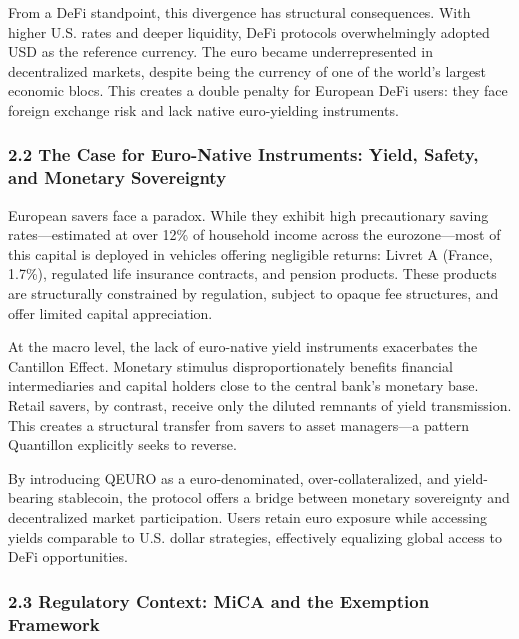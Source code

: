 From a DeFi standpoint, this divergence has structural consequences.
With higher U.S. rates and deeper liquidity, DeFi protocols
overwhelmingly adopted USD as the reference currency. The euro became
underrepresented in decentralized markets, despite being the currency of
one of the world's largest economic blocs. This creates a double penalty
for European DeFi users: they face foreign exchange risk and lack native
euro-yielding instruments.

\hypertarget{the-case-for-euro-native-instruments-yield-safety-and-monetary-sovereignty}{%
\subsubsection{2.2 The Case for Euro-Native Instruments: Yield, Safety,
and Monetary
Sovereignty}\label{the-case-for-euro-native-instruments-yield-safety-and-monetary-sovereignty}}

European savers face a paradox. While they exhibit high precautionary
saving rates---estimated at over 12\% of household income across the
eurozone---most of this capital is deployed in vehicles offering
negligible returns: Livret A (France, 1.7\%), regulated life insurance
contracts, and pension products. These products are structurally
constrained by regulation, subject to opaque fee structures, and offer
limited capital appreciation.

At the macro level, the lack of euro-native yield instruments
exacerbates the Cantillon Effect. Monetary stimulus disproportionately
benefits financial intermediaries and capital holders close to the
central bank's monetary base. Retail savers, by contrast, receive only
the diluted remnants of yield transmission. This creates a structural
transfer from savers to asset managers---a pattern Quantillon explicitly
seeks to reverse.

By introducing QEURO as a euro-denominated, over-collateralized, and
yield-bearing stablecoin, the protocol offers a bridge between monetary
sovereignty and decentralized market participation. Users retain euro
exposure while accessing yields comparable to U.S. dollar strategies,
effectively equalizing global access to DeFi opportunities.

\hypertarget{regulatory-context-mica-and-the-exemption-framework}{%
\subsubsection{2.3 Regulatory Context: MiCA and the Exemption
Framework}\label{regulatory-context-mica-and-the-exemption-framework}}

